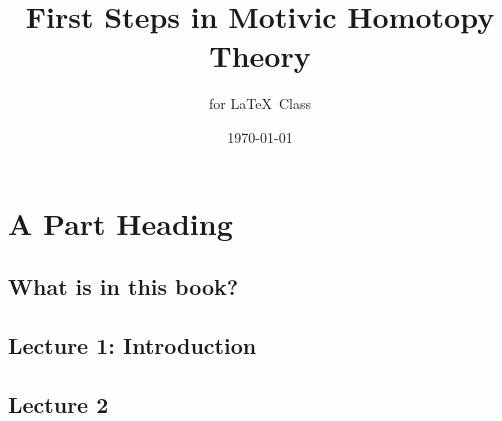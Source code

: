 \documentclass[10pt, english]{book}              %
\title{\bf First Steps in Motivic Homotopy Theory}    %
\author{for \LaTeX\ Class}              %
\date{\today}                           %
\begin{document}
\frontmatter                            %
\maketitle                              %
\tableofcontents                        %
\mainmatter                             %

\part{A Part Heading}                   %


\chapter{What is in this book?}  


\chapter{Lecture 1: Introduction}                %
 


 


\chapter{Lecture 2}

















\end{document}

